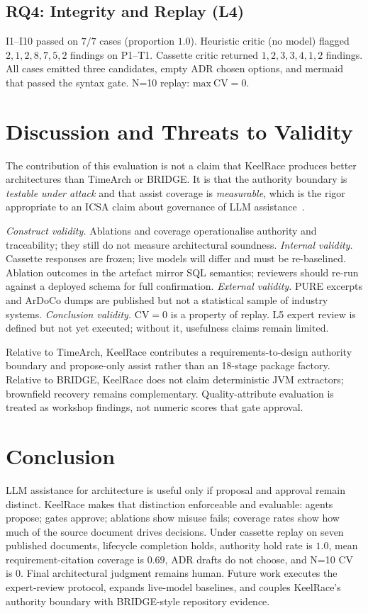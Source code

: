 \documentclass[conference]{IEEEtran}
\begin{document}
\subsection{RQ4: Integrity and Replay (L4)}
I1--I10 passed on $7/7$ cases (proportion $1.0$).
Heuristic critic (no model) flagged $2,1,2,8,7,5,2$ findings on P1--T1.
Cassette critic returned $1,2,3,3,4,1,2$ findings.
All cases emitted three candidates, empty ADR chosen options, and mermaid that passed the syntax gate.
N=10 replay: $\mathrm{max\ CV}=0$.

\section{Discussion and Threats to Validity}

The contribution of this evaluation is not a claim that KeelRace produces better architectures than TimeArch or BRIDGE.
It is that the authority boundary is \emph{testable under attack} and that assist coverage is \emph{measurable}, which is the rigor appropriate to an ICSA claim about governance of LLM assistance~\cite{cervantes2026llms,waseem2026bridge}.

\textit{Construct validity.}
Ablations and coverage operationalise authority and traceability; they still do not measure architectural soundness.
\textit{Internal validity.}
Cassette responses are frozen; live models will differ and must be re-baselined.
Ablation outcomes in the artefact mirror SQL semantics; reviewers should re-run against a deployed schema for full confirmation.
\textit{External validity.}
PURE excerpts and ArDoCo dumps are published but not a statistical sample of industry systems.
\textit{Conclusion validity.}
CV$=0$ is a property of replay.
L5 expert review is defined but not yet executed; without it, usefulness claims remain limited.

Relative to TimeArch, KeelRace contributes a requirements-to-design authority boundary and propose-only assist rather than an 18-stage package factory.
Relative to BRIDGE, KeelRace does not claim deterministic JVM extractors; brownfield recovery remains complementary.
Quality-attribute evaluation is treated as workshop findings, not numeric scores that gate approval.

\section{Conclusion}

LLM assistance for architecture is useful only if proposal and approval remain distinct.
KeelRace makes that distinction enforceable and evaluable: agents propose; gates approve; ablations show misuse fails; coverage rates show how much of the source document drives decisions.
Under cassette replay on seven published documents, lifecycle completion holds, authority hold rate is $1.0$, mean requirement-citation coverage is $0.69$, ADR drafts do not choose, and N=10 CV is $0$.
Final architectural judgment remains human.
Future work executes the expert-review protocol, expands live-model baselines, and couples KeelRace's authority boundary with BRIDGE-style repository evidence.
\end{document}
